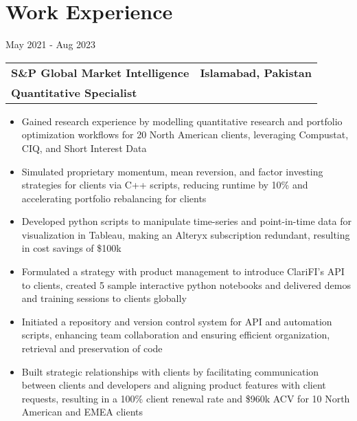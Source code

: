 \documentclass[letterpaper,11pt]{article}
\makeatletter
\newcommand{\resumeItem}[1]{
  \item\small{
    {#1 \vspace{-2pt}}
  }
}
\newcommand{\resumeSubheading}[4]{
  \vspace{-9pt}%
    \begin{tabular*}{0.97\textwidth}[t]{l@{\extracolsep{\fill}}r}
      \textbf{\small{#1}} & \textbf{\small{#2}} \\
      {\small#3} & {\small #4} \\
    \end{tabular*}\vspace{-7pt}
}
\newcommand{\resumeItemListStart}{\begin{itemize}}
\newcommand{\resumeItemListEnd}{\end{itemize}\vspace{-5pt}}
\makeatother
\begin{document}

\section{Work Experience}
\begin{minipage}[t]{0.1\textwidth}
\raggedright %
\small{May 2021 - Aug 2023}
\end{minipage}%
\begin{minipage}[t]{0.9\textwidth}
\begin{adjustwidth}{0.5cm}{0cm} %

\resumeSubheading
      {\small{S\&P Global Market Intelligence}}{\small{Islamabad, Pakistan}}
      {\textbf{\small{Quantitative Specialist}}}{}

    \resumeItemListStart
        \resumeItem{Gained research experience by modelling quantitative research and portfolio optimization workflows
        for 20 North American clients, leveraging Compustat, CIQ, and Short Interest Data}
        \resumeItem{Simulated proprietary momentum, mean reversion, and factor investing strategies for clients via
        C++ scripts, reducing runtime by 10\% and accelerating portfolio rebalancing for clients}
        \resumeItem{Developed python scripts to manipulate time-series and point-in-time data for visualization in
        Tableau, making an Alteryx subscription redundant, resulting in cost savings of     \$100k}
        \resumeItem{Formulated a strategy with product management to introduce ClariFI’s API to clients, created 5 sample interactive python notebooks and delivered demos and training sessions to clients globally}
        \resumeItem{Initiated a repository and version control system for API and automation scripts, enhancing team collaboration and ensuring efficient organization, retrieval and preservation of code}
        \resumeItem{Built strategic relationships with clients by facilitating communication between clients and developers and aligning product features with client requests, resulting in a 100\% client renewal rate and \$960k ACV for 10 North American and EMEA clients}\newline
    \resumeItemListEnd
      
\end{adjustwidth}
\end{minipage}
\end{document}
